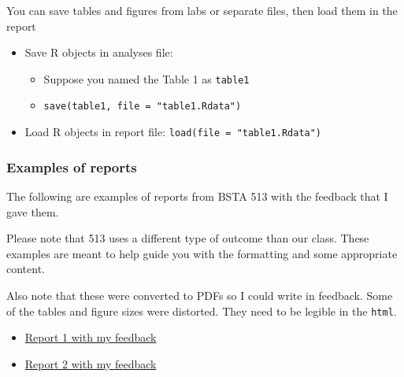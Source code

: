 \documentclass[
  letterpaper,
  DIV=11,
  numbers=noendperiod]{scrartcl}
\providecommand{\tightlist}{%
  \setlength{\itemsep}{0pt}\setlength{\parskip}{0pt}}\usepackage{longtable,booktabs,array}
\begin{document}
\begin{tcolorbox}[enhanced jigsaw, left=2mm, bottomrule=.15mm, coltitle=black, opacitybacktitle=0.6, title=\textcolor{quarto-callout-note-color}{\faInfo}\hspace{0.5em}{The project report is a separate file from the labs}, opacityback=0, arc=.35mm, colback=white, toprule=.15mm, toptitle=1mm, colbacktitle=quarto-callout-note-color!10!white, bottomtitle=1mm, rightrule=.15mm, titlerule=0mm, leftrule=.75mm, colframe=quarto-callout-note-color-frame, breakable]

You can save tables and figures from labs or separate files, then load
them in the report

\begin{itemize}
\tightlist
\item
  Save R objects in analyses file:

  \begin{itemize}
  \tightlist
  \item
    Suppose you named the Table 1 as \texttt{table1}
  \item
    \texttt{save(table1,\ file\ =\ "table1.Rdata")}
  \end{itemize}
\item
  Load R objects in report file: \texttt{load(file\ =\ "table1.Rdata")}
\end{itemize}

\end{tcolorbox}

\hypertarget{examples-of-reports}{%
\subsubsection{Examples of reports}\label{examples-of-reports}}

The following are examples of reports from BSTA 513 with the feedback
that I gave them.

Please note that 513 uses a different type of outcome than our class.
These examples are meant to help guide you with the formatting and some
appropriate content.

Also note that these were converted to PDFs so I could write in
feedback. Some of the tables and figure sizes were distorted. They need
to be legible in the \texttt{html}.

\begin{itemize}
\item
  \href{https://ohsuitg-my.sharepoint.com/:b:/r/personal/wakim_ohsu_edu/Documents/Teaching/Classes/W2024_BSTA_512_612/Student_files/Project_examples/Group_09_Report.pdf?csf=1\&web=1\&e=54lAbD}{Report
  1 with my feedback}
\item
  \href{https://ohsuitg-my.sharepoint.com/:b:/r/personal/wakim_ohsu_edu/Documents/Teaching/Classes/W2024_BSTA_512_612/Student_files/Project_examples/Group_07_Report.pdf?csf=1\&web=1\&e=uWHgnB}{Report
  2 with my feedback}
\end{itemize}
\end{document}
